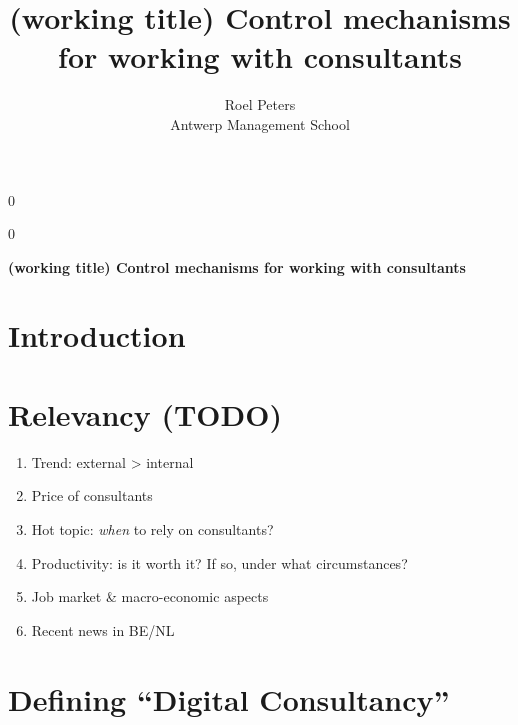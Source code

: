 \documentclass[12pt]{article}
\newcommand{\blind}{0}
\providecommand{\tightlist}{%
  \setlength{\itemsep}{0pt}\setlength{\parskip}{0pt}}
\begin{document}
\def\spacingset#1{\renewcommand{\baselinestretch}%
{#1}\small\normalsize} \spacingset{1}



\blind
{
  \title{\bf (working title) Control mechanisms for working with
consultants}

  \author{
        Roel Peters \\
    Antwerp Management School\\
      }
  \maketitle
} \fi

\blind
{
  \bigskip
  \bigskip
  \bigskip
  \begin{center}
    {\LARGE\bf (working title) Control mechanisms for working with
consultants}
  \end{center}
  \medskip
} \fi

\bigskip

\noindent%
 

\vfill

\newpage
\spacingset{1.9} %

\section{Introduction}\label{introduction}

\section{Relevancy (TODO)}\label{relevancy-todo}

\begin{enumerate}
\def\labelenumi{\arabic{enumi}.}
\tightlist
\item
  Trend: external \textgreater{} internal
\item
  Price of consultants
\item
  Hot topic: \emph{when} to rely on consultants?
\item
  Productivity: is it worth it? If so, under what circumstances?
\item
  Job market \& macro-economic aspects
\item
  Recent news in BE/NL
\end{enumerate}

\section{Defining ``Digital
Consultancy''}\label{defining-digital-consultancy}
\end{document}
